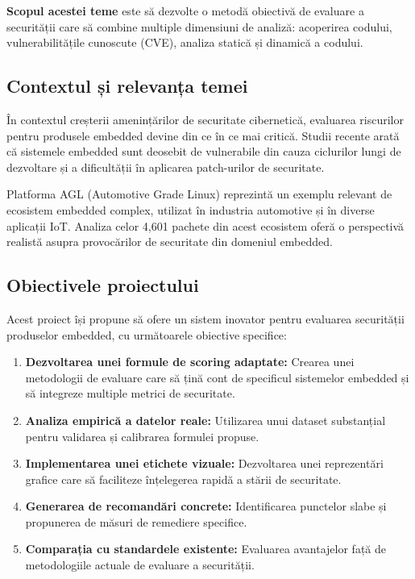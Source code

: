 \documentclass[12pt,a4paper]{article}
\begin{document}
\textbf{Scopul acestei teme} este să dezvolte o metodă obiectivă de evaluare a securității care să combine multiple dimensiuni de analiză: acoperirea codului, vulnerabilitățile cunoscute (CVE), analiza statică și dinamică a codului.

\subsection{Contextul și relevanța temei}

În contextul creșterii amenințărilor de securitate cibernetică, evaluarea riscurilor pentru produsele embedded devine din ce în ce mai critică. Studii recente arată că sistemele embedded sunt deosebit de vulnerabile din cauza ciclurilor lungi de dezvoltare și a dificultății în aplicarea patch-urilor de securitate.

Platforma AGL (Automotive Grade Linux) reprezintă un exemplu relevant de ecosistem embedded complex, utilizat în industria automotive și în diverse aplicații IoT. Analiza celor 4,601 pachete din acest ecosistem oferă o perspectivă realistă asupra provocărilor de securitate din domeniul embedded.

\subsection{Obiectivele proiectului}

Acest proiect își propune să ofere un sistem inovator pentru evaluarea securității produselor embedded, cu următoarele obiective specifice:

\begin{enumerate}[label=\arabic*.]
    \item \textbf{Dezvoltarea unei formule de scoring adaptate:} Crearea unei metodologii de evaluare care să țină cont de specificul sistemelor embedded și să integreze multiple metrici de securitate.
    
    \item \textbf{Analiza empirică a datelor reale:} Utilizarea unui dataset substanțial pentru validarea și calibrarea formulei propuse.
    
    \item \textbf{Implementarea unei etichete vizuale:} Dezvoltarea unei reprezentări grafice care să faciliteze înțelegerea rapidă a stării de securitate.
    
    \item \textbf{Generarea de recomandări concrete:} Identificarea punctelor slabe și propunerea de măsuri de remediere specifice.
    
    \item \textbf{Comparația cu standardele existente:} Evaluarea avantajelor față de metodologiile actuale de evaluare a securității.
\end{enumerate}
\end{document}
